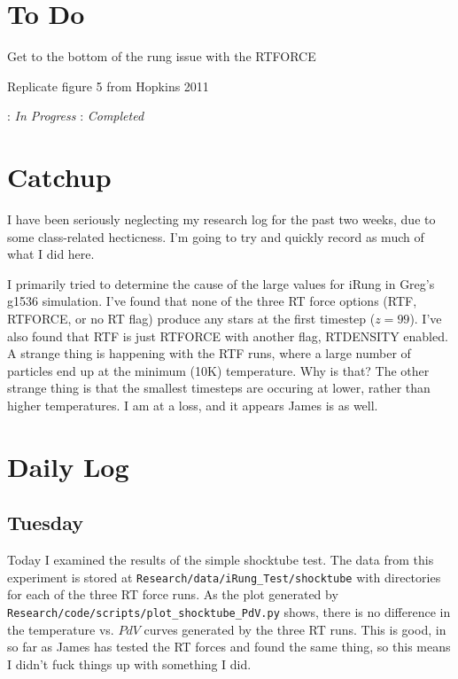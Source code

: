 \documentclass[11pt,letterpaper]{article}
\begin{document}
\section{To Do}
\begin{bullets}
\item[\textleaf] Get to the bottom of the rung issue with the RTFORCE
\item[\textleaf] Replicate figure 5 from Hopkins 2011
\end{bullets}

\textleaf : \textit{In Progress} \qquad \checkmark : \textit{Completed}
\section{Catchup}

I have been seriously neglecting my research log for the past two weeks,
due to some class-related hecticness. I'm going to try and quickly
record as much of what I did here.

I primarily tried to determine the cause of the large values for iRung
in Greg's g1536 simulation. I've found that none of the three RT force
options (RTF, RTFORCE, or no RT flag) produce any stars at the first
timestep ($z=99$). I've also found that RTF is just RTFORCE with another
flag, RTDENSITY enabled. A strange thing is happening with the RTF runs,
where a large number of particles end up at the minimum (10K)
temperature. Why is that? The other strange thing is that the smallest
timesteps are occuring at lower, rather than higher temperatures. I am
at a loss, and it appears James is as well.

\section{Daily Log}

\subsection{Tuesday}

Today I examined the results of the simple shocktube test. The data from
this experiment is stored at
\texttt{Research/data/iRung\_Test/shocktube} with directories for each
of the three RT force runs. As the plot generated by
\texttt{Research/code/scripts/plot\_shocktube\_PdV.py} shows, there is
no difference in the temperature vs. $PdV$ curves generated by the three
RT runs. This is good, in so far as James has tested the RT forces and
found the same thing, so this means I didn't fuck things up with
something I did.
\end{document}
